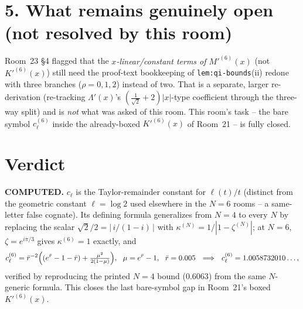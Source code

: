 \documentclass[11pt]{article}
\begin{document}
\section*{5. What remains genuinely open (not resolved by this room)}

Room~23 \S4 flagged that the \emph{$x$-linear/constant terms of $M'^{(6)}(x)$} (not $K'^{(6)}(x)$)
still need the proof-text bookkeeping of \texttt{lem:qi-bounds}(ii) redone with three branches
($\rho=0,1,2$) instead of two. That is a separate, larger re-derivation (re-tracking
$\Lambda'(x)$'s $(\frac1{\sqrt2}+2)|x|$-type coefficient through the three-way split) and is
\emph{not} what was asked of this room. This room's task -- the bare symbol $c_\ell^{(6)}$ inside
the already-boxed $K'^{(6)}(x)$ of Room~21 -- is fully closed.

\section*{Verdict}

\textbf{COMPUTED.} $c_\ell$ is the Taylor-remainder constant for $\ell(t)/t$ (distinct from the
geometric constant $\ell=\log2$ used elsewhere in the $N=6$ rooms -- a same-letter false
cognate). Its defining formula generalizes from $N=4$ to every $N$ by replacing the scalar
$\sqrt2/2=|\,i/(1-i)\,|$ with $\kappa^{(N)}=1/|1-\zeta^{(N)}|$; at $N=6$, $\zeta=e^{i\pi/3}$ gives
$\kappa^{(6)}=1$ exactly, and
\[
  c_\ell^{(6)}=\bar r^{-2}\Bigl((e^{\bar r}-1-\bar r)+\tfrac{\mu^2}{2(1-\mu)}\Bigr),\ \ \mu=e^{\bar r}-1,\ \
  \bar r=0.005\ \ \Longrightarrow\ \ c_\ell^{(6)}=1.0058732010\ldots,
\]
verified by reproducing the printed $N=4$ bound ($0.6063$) from the same $N$-generic formula.
This closes the last bare-symbol gap in Room~21's boxed $K'^{(6)}(x)$.
\end{document}
